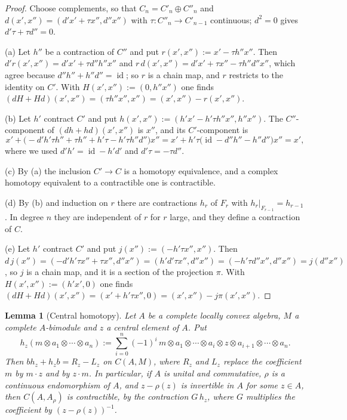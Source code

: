\documentclass[11pt]{amsart}
\newtheorem{lemma}[theorem]{Lemma}
\theoremstyle{definition}
\theoremstyle{remark}
\newcommand{\id}{\operatorname{id}}
\begin{document}
\begin{proof}
Choose complements, so that $C_n=C'_n\oplus C''_n$ and
$d(x',x'')=(d'x'+\tau x'',d''x'')$ with $\tau:C''_n\to C'_{n-1}$ continuous;
$d^{2}=0$ gives $d'\tau+\tau d''=0$.

(a) Let $h''$ be a contraction of $C''$ and put $r(x',x''):=x'-\tau h''x''$.
Then $d'r(x',x'')=d'x'+\tau d''h''x''$ and
$r\,d(x',x'')=d'x'+\tau x''-\tau h''d''x''$, which agree because
$d''h''+h''d''=\id$; so $r$ is a chain map, and $r$ restricts to the identity
on $C'$.  With $H(x',x''):=(0,h''x'')$ one finds
$(dH+Hd)(x',x'')=(\tau h''x'',x'')=(x',x'')-r(x',x'')$.

(b) Let $h'$ contract $C'$ and put $h(x',x''):=(h'x'-h'\tau h''x'',h''x'')$.
The $C''$-component of $(dh+hd)(x',x'')$ is $x''$, and its $C'$-component is
\[
x'+\bigl(-d'h'\tau h''+\tau h''+h'\tau-h'\tau h''d''\bigr)x''
=x'+h'\tau\bigl(\id-d''h''-h''d''\bigr)x''=x',
\]
where we used $d'h'=\id-h'd'$ and $d'\tau=-\tau d''$.

(c) By (a) the inclusion $C'\to C$ is a homotopy equivalence, and a complex
homotopy equivalent to a contractible one is contractible.

(d) By (b) and induction on $r$ there are contractions $h_r$ of $F_r$ with
$h_r|_{F_{r-1}}=h_{r-1}$.  In degree $n$ they are independent of $r$ for $r$
large, and they define a contraction of $C$.

(e) Let $h'$ contract $C'$ and put $j(x''):=(-h'\tau x'',x'')$.  Then
$d\,j(x'')=(-d'h'\tau x''+\tau x'',d''x'')=(h'd'\tau x'',d''x'')
=(-h'\tau d''x'',d''x'')=j(d''x'')$, so $j$ is a chain map, and it is a section
of the projection $\pi$.  With $H(x',x''):=(h'x',0)$ one finds
$(dH+Hd)(x',x'')=(x'+h'\tau x'',0)=(x',x'')-j\pi(x',x'')$.
\end{proof}

\begin{lemma}[Central homotopy]\label{lem:central}
Let $A$ be a complete locally convex algebra, $M$ a complete $A$-bimodule and
$z$ a central element of $A$.  Put
\[
h_z(m\otimes a_1\otimes\cdots\otimes a_n):=\sum_{i=0}^{n}(-1)^{i}\,m\otimes
a_1\otimes\cdots\otimes a_i\otimes z\otimes a_{i+1}\otimes\cdots\otimes a_n .
\]
Then $bh_z+h_zb=R_z-L_z$ on $C(A,M)$, where $R_z$ and $L_z$ replace the
coefficient $m$ by $m\cdot z$ and by $z\cdot m$.  In particular, if $A$ is
unital and commutative, $\rho$ is a continuous endomorphism of $A$, and
$z-\rho(z)$ is invertible in $A$ for some $z\in A$, then $C(A,A_{\rho})$ is
contractible, by the contraction $G\,h_z$, where $G$ multiplies the coefficient
by $(z-\rho(z))^{-1}$.
\end{lemma}
\end{document}
